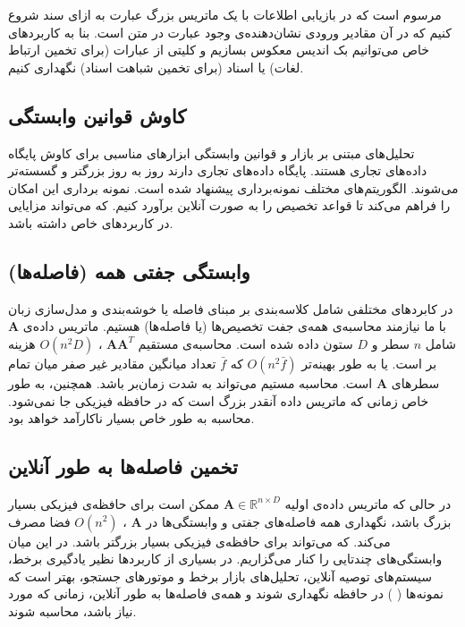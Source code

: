 مرسوم است که در بازیابی اطلاعات با یک ماتریس بزرگ عبارت به ازای سند شروع کنیم که در آن مقادیر ورودی نشان‌دهنده‌ی وجود عبارت در متن است. بنا به کاربردهای خاص می‌توانیم بک اندیس معکوس %
بسازیم و کلیتی از عبارات (برای تخمین ارتباط لغات) یا اسناد (برای تخمین شباهت اسناد) نگهداری کنیم.

\subsection{
کاوش قوانین وابستگی
}
تحلیل‌های مبتنی بر بازار و قوانین وابستگی 
\cite{litez8, litez9, litez10}
ابزارهای مناسبی برای کاوش پایگاه‌ داده‌های تجاری هستند. پایگاه داده‌های تجاری دارند روز به روز بزرگتر و گسسته‌تر می‌شوند.
\cite{litez7, litez158}
الگوریتم‌های مختلف نمونه‌برداری پیشنهاد شده است. نمونه برداری این امکان را فراهم می‌کند تا قواعد تخصیص را به صورت آنلاین برآورد کنیم. که می‌تواند مزایایی در کاربردهای خاص داشته باشد.

\subsection{
وابستگی جفتی همه (فاصله‌ها)
}
در کابردهای مختلفی شامل کلاسه‌بندی بر مبنای فاصله یا خوشه‌بندی و مدل‌سازی زبان با 
%
\cite{litez48}
ما نیازمند محاسبه‌ی همه‌ی جفت تخصیص‌ها (یا فاصله‌ها) هستیم. ماتریس داده‌ی 
$\mathbf{A}$
شامل 
$n$
سطر و 
$D$
ستون داده شده است. محاسبه‌ی مستقیم
$\mathbf{AA}^T$
،
$O(n^2 D)$
هزینه بر است. یا به طور بهینه‌تر 
$O(n^2 \bar{f})$
که 
$\bar{f}$
تعداد میانگین مقادیر غیر صفر میان تمام سطرهای 
‌$\mathbf{A}$
است. محاسبه مستیم می‌تواند به شدت زمان‌بر باشد. همچنین، به طور خاص زمانی که ماتریس داده آنقدر بزرگ است که در حافظه فیزیکی جا نمی‌شود. محاسبه به طور خاص بسیار ناکارآمد خواهد بود.

\subsection{
تخمین فاصله‌ها به طور آنلاین
}
در حالی که ماتریس داده‌ی اولیه 
$\mathbf{A} \in \mathbb{R}^{n \times D}$
ممکن است برای حافظه‌ی فیزیکی بسیار بزرگ باشد، نگهداری%
همه فاصله‌های جفتی و وابستگی‌ها در 
$\mathbf{A}$
،
$O(n^2)$
فضا مصرف می‌کند. که می‌تواند برای حافظه‌ی فیزیکی بسیار بزرگتر باشد. در این میان وابستگی‌های چندتایی را کنار می‌گزاریم. در بسیاری از کاربردها نظیر یادگیری برخط، سیستم‌های توصیه آنلاین، تحلیل‌های بازار برخط و موتورهای جستجو، بهتر است که نمونه‌ها (
) در حافظه نگهداری شوند و همه‌ی فاصله‌ها به طور آنلاین، زمانی که مورد نیاز باشد، محاسبه شوند.

